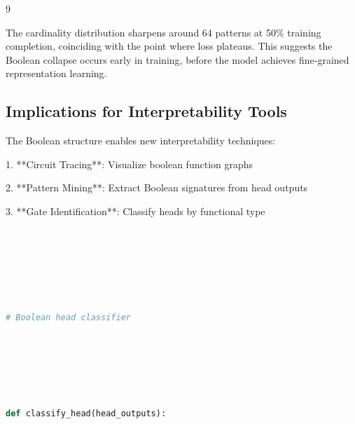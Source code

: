 \documentclass[11pt]{article}
\theoremstyle{definition}
\begin{document}
\begin{thebibliography}{9}
{{{\begin{figure}[h]
\end{figure}













The cardinality distribution sharpens around 64 patterns at 50\% training completion, coinciding with the point where loss plateaus. This suggests the Boolean collapse occurs early in training, before the model achieves fine-grained representation learning.













\subsection{Implications for Interpretability Tools}






The Boolean structure enables new interpretability techniques:






1. **Circuit Tracing**: Visualize boolean function graphs






2. **Pattern Mining**: Extract Boolean signatures from head outputs






3. **Gate Identification**: Classify heads by functional type













\begin{lstlisting}[language=python]






# Boolean head classifier






def classify_head(head_outputs):







\end{lstlisting}}}}
\end{thebibliography}
\end{document}
